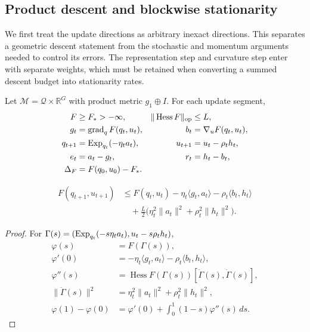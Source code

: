 \subsection{Product descent and blockwise stationarity}
\label{app:rigid-descent}
We first treat the update directions as arbitrary inexact directions. This separates a geometric descent statement from the stochastic and momentum arguments needed to control its errors. The representation step and curvature step enter with separate weights, which must be retained when converting a summed descent budget into stationarity rates.
\begin{assumption}
\label{ass:descent-new}
Let $\mathcal M=\mathcal Q\times\mathbb R^G$ with product metric $g_1\oplus I$.
For each update segment,
\begin{align}
 F&\ge F_*>-\infty,&
 \|\operatorname{Hess}F\|_{\rm op}&\le L,\\
 g_t&=\operatorname{grad}_qF(q_t,u_t),&b_t&=\nabla_uF(q_t,u_t),\\
 q_{t+1}&=\operatorname{Exp}_{q_t}(-\eta_ta_t),&u_{t+1}&=u_t-\rho_th_t,\label{eq:analysis-update}\\
 e_t&=a_t-g_t,&r_t&=h_t-b_t,\\
 \Delta_F&=F(q_0,u_0)-F_*.
\end{align}
\end{assumption}

\begin{lemma}
\label{lem:rigid-product-descent}
\begin{align}
 F(q_{t+1},u_{t+1})
 &\le F(q_t,u_t)-\eta_t\langle g_t,a_t\rangle
 -\rho_t\langle b_t,h_t\rangle\\
 &\quad+\tfrac L2\bigl(\eta_t^2\|a_t\|^2+\rho_t^2\|h_t\|^2\bigr).
\end{align}
\end{lemma}
\begin{proof}
For $\Gamma(s)=(\operatorname{Exp}_{q_t}(-s\eta_ta_t),u_t-s\rho_th_t)$,
\begin{align}
 \varphi(s)&=F(\Gamma(s)),\\
 \varphi'(0)&=-\eta_t\langle g_t,a_t\rangle-\rho_t\langle b_t,h_t\rangle,\\
 \varphi''(s)&=\operatorname{Hess}F(\Gamma(s))[\dot\Gamma(s),\dot\Gamma(s)],\\
 \|\dot\Gamma(s)\|^2&=\eta_t^2\|a_t\|^2+\rho_t^2\|h_t\|^2,\\
 \varphi(1)-\varphi(0)
 &=\varphi'(0)+\int_0^1(1-s)\varphi''(s)\,ds.
\end{align}
\end{proof}

